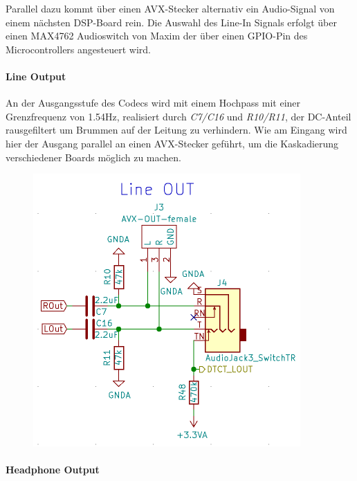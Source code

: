 Parallel dazu kommt über einen AVX-Stecker alternativ ein Audio-Signal von einem nächsten DSP-Board rein. Die Auswahl des Line-In Signals erfolgt über einen MAX4762 \cite{max4762} Audioswitch von Maxim der über einen GPIO-Pin des Microcontrollers angesteuert wird. 

\paragraph{Line Output}
\label{par:LineOUT}
An der Ausgangsstufe des Codecs wird mit einem Hochpass mit einer Grenzfrequenz von 1.54Hz, realisiert durch \textit{C7/C16} und \textit{R10/R11}, der DC-Anteil rausgefiltert um Brummen auf der Leitung zu verhindern.
Wie am Eingang wird hier der Ausgang parallel an einen AVX-Stecker geführt, um die Kaskadierung verschiedener Boards möglich zu machen.


\begin{figure} [H]
\begin{center}
 \includegraphics[scale=0.5]{../graphics/Schema_LineOUT.png}
\caption{}
\label{fig:Schema_LineOUT}
\end{center}
\end{figure}


\paragraph{Headphone Output}
\label{par:HPOUT}


